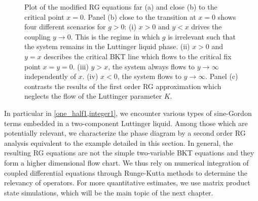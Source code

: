 \begin{figure}
    \caption{Plot of the modified RG equations far (a) and close (b) to the critical point $x=0$. Panel (b) close to the transition at $x=0$ shows four different scenarios for $g>0$: (i) $x>0$ and $y<x$ drives the coupling $y\rightarrow0$. This is the regime in which $g$ is irrelevant such that the system remains in the Luttinger liquid phase. (ii) $x>0$ and $y=x$ describes the critical BKT line which flows to the critical fix point $x=y=0$. (iii) $y>x$, the system always flows to $y\rightarrow\infty$ independently of $x$. (iv) $x<0$, the system flows to $y\rightarrow\infty$. Panel (c) contrasts the results of the first order RG approximation which neglects the flow of the Luttinger parameter $K$.}
    \label{fig:bkt_flow_equations}
\end{figure}

In particular in \cref{one_half1,integer1}, we encounter various types of sine-Gordon terms embedded in a two-component Luttinger liquid.
Among those which are potentially relevant, we characterize the phase diagram by a second order RG analysis equivalent to the example detailed in this section.
In general, the resulting RG equations are not the simple two-variable BKT equations and they form a higher dimensional flow chart.
We thus rely on numerical integration of coupled differential equations through Runge-Kutta methods to determine the relevancy of operators.
For more quantitative estimates, we use matrix product state simulations, which will be the main topic of the next chapter.
